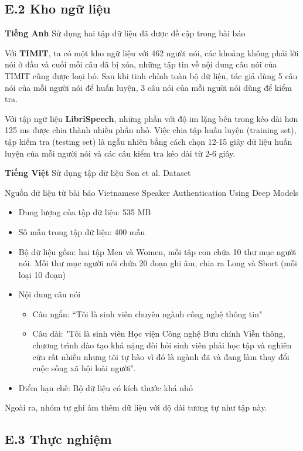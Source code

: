 \documentclass{article}
\begin{document}
	\subsection{E.2 Kho ngữ liệu}
	\qquad \textbf{Tiếng Anh} Sử dụng hai tập dữ liệu đã được đề cập trong bài báo
	
	Với \textbf{TIMIT}, ta có một kho ngữ liệu với 462 người nói, các khoảng không phải lời nói ở đầu và cuối mỗi câu đã bị xóa, những tập tin về nội dung câu nói của TIMIT cũng được loại bỏ. Sau khi tinh chỉnh toàn bộ dữ liệu, tác giả dùng 5 câu nói của mỗi người nói để huấn luyện, 3 câu nói của mỗi người nói dùng để kiểm tra.
	
	Với tập ngữ liệu \textbf{LibriSpeech}, những phần với độ im lặng bên trong kéo dài hơn 125 ms được chia thành nhiều phần nhỏ. Việc chia tập huấn luyện (training set), tập kiểm tra (testing set) là ngẫu nhiên bằng cách chọn 12-15 giây dữ liệu huấn luyện của mỗi người nói và các câu kiểm tra kéo dài từ 2-6 giây. 
	
	\textbf{Tiếng Việt} Sử dụng tập dữ liệu Son et al. Dataset
	
	Nguồn dữ liệu từ bài báo Vietnamese Speaker Authentication Using Deep Models
	\begin{itemize}
		\item Dung lượng của tập dữ liệu: 535 MB
		\item Số mẫu trong tập dữ liệu: 400 mẫu
		\item Bộ dữ liệu gồm: hai tập  Men và Women, mỗi tập con chứa 10 thư mục người nói. Mỗi thư mục người nói chứa 20 đoạn ghi âm, chia ra Long và Short (mỗi loại 10 đoạn) 
		\item Nội dung câu nói
		\begin{itemize}
			\item Câu ngắn: “Tôi là sinh viên chuyên ngành công nghệ thông tin"
			\item Câu dài: "Tôi là sinh viên Học viện Công nghệ Bưu chính Viễn thông, chương trình đào tạo khá nặng đòi hỏi sinh viên phải học tập và nghiên cứu rất nhiều nhưng tôi tự hào vì đó là ngành đã và đang làm thay đổi cuộc sống xã hội loài người".
		\end{itemize}
		\item Điểm hạn chế: Bộ dữ liệu có kích thước khá nhỏ
	\end{itemize}
	
	Ngoài ra, nhóm tự ghi âm thêm dữ liệu với độ dài tương tự như tập này.
	\subsection{E.3 Thực nghiệm}
\end{document}
